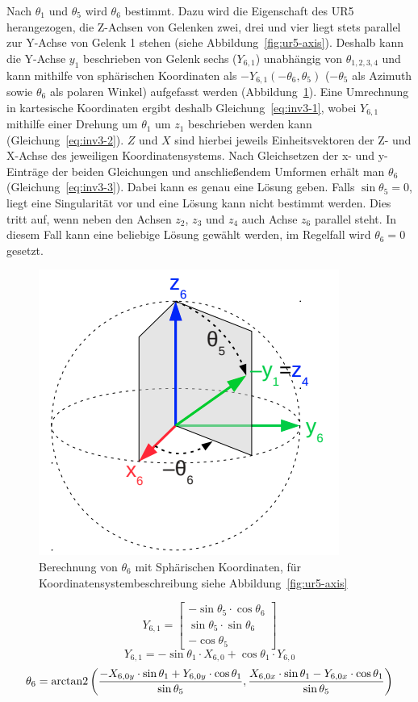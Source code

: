 Nach $\theta_1$ und $\theta_5$ wird $\theta_6$ bestimmt.
Dazu wird die Eigenschaft des UR5 herangezogen, die Z-Achsen von Gelenken zwei, drei und vier liegt stets parallel zur Y-Achse von Gelenk 1 stehen (siehe Abbildung~\ref{fig:ur5-axis}).
Deshalb kann die Y-Achse $y_1$ beschrieben von Gelenk sechs ($Y_{6,1}$) unabhängig von $\theta_{1,2,3,4}$ und kann mithilfe von sphärischen Koordinaten als $-Y_{6,1}(-\theta_6,\theta_5)$ ($-\theta_5$ als Azimuth sowie $\theta_6$ als polaren Winkel) aufgefasst werden (Abbildung~\ref{fig:inv1-3}).
Eine Umrechnung in kartesische Koordinaten ergibt deshalb Gleichung~\ref{eq:inv3-1}, wobei $Y_{6,1}$ mithilfe einer Drehung um $\theta_1$ um $z_1$ beschrieben werden kann (Gleichung~\ref{eq:inv3-2}).
$Z$ und $X$ sind hierbei jeweils Einheitsvektoren der Z- und X-Achse des jeweiligen Koordinatensystems.
Nach Gleichsetzen der x- und y-Einträge der beiden Gleichungen und anschließendem Umformen erhält man $\theta_6$ (Gleichung~\ref{eq:inv3-3}).
Dabei kann es genau eine Lösung geben.
Falls $\sin\theta_5=0$, liegt eine Singularität vor und eine Lösung kann nicht bestimmt werden.
Dies tritt auf, wenn neben den Achsen $z_2$, $z_3$ und $z_4$ auch Achse $z_6$ parallel steht.
In diesem Fall kann eine beliebige Lösung gewählt werden, im Regelfall wird $\theta_6=0$ gesetzt.

\begin{figure}[h]
    \centering
    \includegraphics[width = .4\textwidth]{Bilder/inv3}
    \caption{Berechnung von $\theta_6$ mit Sphärischen Koordinaten, für Koordinatensystembeschreibung siehe Abbildung~\ref{fig:ur5-axis}~\cite{rasmusandersenKinematicsUR52018}}\label{fig:inv1-3}
\end{figure}
\begin{equation}
    Y_{6,1}=
    \begin{bmatrix}
        -\sin\theta_5 \cdot \cos\theta_6 \\ \sin\theta_5 \cdot\sin\theta_6 \\ -\cos\theta_5
    \end{bmatrix}
    \label{eq:inv3-1}
\end{equation}
\begin{equation}
    Y_{6,1}=
    -\sin\theta_1\cdot X_{6,0} + \cos\theta_1\cdot Y_{6,0}
    \label{eq:inv3-2}
\end{equation}
\begin{equation}
    \theta_6=
    \operatorname{arctan2}\left(
    \frac{
        -X_{6,0y} \cdot \sin\theta_1 + Y_{6,0y} \cdot \cos\theta_1
    }{
        \sin\theta_5
    },
    \frac{
        X_{6,0x} \cdot \sin\theta_1 - Y_{6,0x} \cdot \cos\theta_1
    }{
        \sin\theta_5
    }\right)
    \label{eq:inv3-3}
\end{equation}


